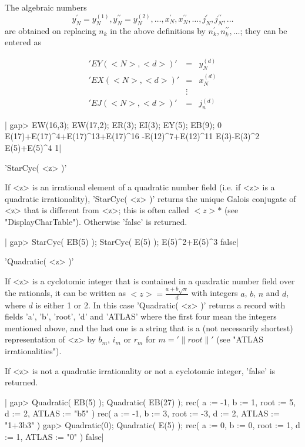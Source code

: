 The algebraic numbers
\[y_N^{\prime}=y_N^{(1)},y_N^{\prime\prime}=y_N^{(2)},\ldots,
x_N^{\prime},x_N^{\prime\prime},\ldots,
j_N^{\prime},j_N^{\prime\prime},\ldots\]
are obtained on replacing $n_k$ in the above
definitions by $n_k^{\prime},n_k^{\prime\prime},\ldots$; they
can be entered as

\[\begin{array}{lll}
'EY(<N>,<d>)' & = & y_N^{(d)}\\
'EX(<N>,<d>)' & = & x_N^{(d)}\\
 & \vdots \\
'EJ(<N>,<d>)' & = & j_n^{(d)}
\end{array}\]

|    gap> EW(16,3); EW(17,2); ER(3); EI(3); EY(5); EB(9);
    0
    E(17)+E(17)^4+E(17)^13+E(17)^16
    -E(12)^7+E(12)^11
    E(3)-E(3)^2
    E(5)+E(5)^4
    1|


'StarCyc( <z> )'

If <z> is an irrational  element of a  quadratic number field (i.e. if
<z> is a quadratic irrationality), 'StarCyc( <z> )' returns the unique
Galois  conjugate  of <z> that is different from  <z>;  this is  often
called  $<z>\ast$   (see  "DisplayCharTable").  Otherwise  'false'  is
returned.

|    gap> StarCyc( EB(5) ); StarCyc( E(5) );
    E(5)^2+E(5)^3
    false|


'Quadratic( <z> )'

If <z> is a cyclotomic integer that is contained in a quadratic number
field over  the rationals, it can  be written as $<z> = \frac{  a +  b
\sqrt{n} }{d}$  with integers  $a$, $b$, $n$  and $d$,  where  $d$  is
either 1 or 2.  In this case 'Quadratic( <z>  )' returns a record with
fields 'a', 'b', 'root', 'd' and 'ATLAS' where the first four mean the
integers mentioned above, and the last one is a string that is a  (not
necessarily  shortest)  representation of <z> by $b_m$, $i_m$ or $r_m$
for $m = '\|root\|'$ (see "ATLAS irrationalities").

If <z>  is not a quadratic irrationality  or not a cyclotomic integer,
'false' is returned.

|    gap> Quadratic( EB(5) ); Quadratic( EB(27) );
    rec(
      a := -1,
      b := 1,
      root := 5,
      d := 2,
      ATLAS := "b5" )
    rec(
      a := -1,
      b := 3,
      root := -3,
      d := 2,
      ATLAS := "1+3b3" )
    gap> Quadratic(0); Quadratic( E(5) );
    rec( 
      a := 0,
      b := 0,
      root := 1,
      d := 1,
      ATLAS := "0" )
    false|

